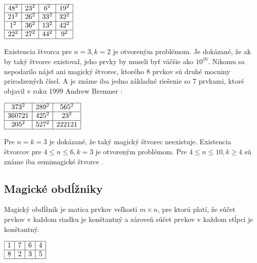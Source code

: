 \begin{center}
$\begin{array}{ |c|c|c|c| } 
\hline
48^2 & 23^2 & 6^2 & 19^2 \\ 
\hline
21^2 & 26^2 & 33^2 & 32^2 \\ 
\hline
1^2 & 36^2 & 13^2 & 42^2 \\
\hline
22^2 & 27^2 & 44^2 & 9^2 \\
\hline
\end{array}$
\end{center}

Existencia štvorca pre $n = 3, k = 2$ je otvoreným problémom. Je dokázané, že ak by taký štvorec existoval, jeho prvky by museli byť väčšie ako $10^{16}$. Nikomu sa nepodarilo nájsť ani magický štvorec, ktorého $8$ prvkov sú druhé mocniny prirodzených čísel. A je známe iba jedno základné riešenie so $7$ prvkami, ktoré objavil v roku 1999 Andrew Bremner \cite{multimagie}:

\begin{center}
$\begin{array}{ |c|c|c| } 
\hline
373^2 & 289^2 & 565^2 \\ 
\hline
360721 & 425^2 & 23^2 \\ 
\hline
205^2 & 527^2 & 222121 \\
\hline
\end{array}$
\end{center}

Pre $n = k = 3$ je dokázané, že taký magický štvorec neexistuje. Existencia štvorcov pre $4 \leq n \leq 6, k = 3$ je otvoreným problémom. Pre $4 \leq n \leq 10, k \geq 4$ sú známe iba semimagické štvorce \cite{multimagie}.

\subsection{Magické obdĺžniky}
\begin{definition} Magický obdĺžnik je matica prvkov veľkosti $m \times n$, pre ktorú platí, že súčet prvkov v každom riadku je konštantný a zároveň súčet prvkov v každom stĺpci je konštantný.
\end{definition}

\begin{center}
$\begin{array}{ |c|c|c|c| } 
\hline
1 & 7 & 6 & 4 \\ 
\hline
8 & 2 & 3 & 5 \\
\hline
\end{array}$
\end{center}


